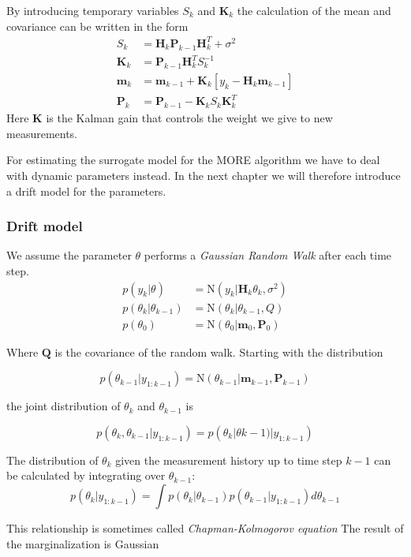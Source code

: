 By introducing temporary variables $S_k$ and $\mathbf{K}_k$ the calculation of
the mean and covariance can be written in the form
\begin{align*}
     S_k &= \textbf{H}_k \textbf{P}_{k-1} \textbf{H}^T_k + \sigma^2 \\
     \textbf{K}_k &= \textbf{P}_{k-1} \textbf{H}^T_k S_k^{-1} \\
     \textbf{m}_k &= \textbf{m}_{k-1} + \textbf{K}_k [y_k - \textbf{H}_k \textbf{m}_{k-1}] \\
     \textbf{P}_k &= \textbf{P}_{k-1} - \textbf{K}_k S_k \textbf{K}_k^T
\end{align*}
Here $\mathbf{K}$ is the Kalman gain that controls the weight we give to new
measurements.

For estimating the surrogate model for the MORE algorithm we have to
deal with dynamic parameters instead. In the next chapter we will therefore
introduce a drift model for the parameters.

\subsubsection{Drift model}
We assume the parameter $\theta$ performs a \textit{Gaussian Random Walk} after
each time step.
\begin{align}
  p(y_k | \theta) &= \text{N}(y_k | \mathbf{H}_k \theta_k, \sigma^2) \\
  p(\theta_k | \theta_{k-1}) &= \text{N} (\theta_k | \theta_{k-1}, Q) \\
  p(\theta_0) &= \text{N}(\theta_0 | \mathbf{m}_0, \mathbf{P}_0)
\end{align}

Where $\mathbf{Q}$ is the covariance of the random walk. 
Starting with the distribution

$$ p(\theta_{k-1} | y_{1:k-1})
= \text{N}(\theta_{k-1} | \mathbf{m}_{k-1}, \mathbf{P}_{k-1}) $$

the joint distribution of $\theta_k$ and $\theta_{k-1}$ is

$$ p(\theta_k, \theta_{k-1} | y_{1:k-1})
= p(\theta_k | \theta{k-1}) | y_{1:k-1})
$$

The distribution of $\theta_k$ given the measurement history up to time
step $k - 1$ can be calculated by integrating over
$\theta_{k-1}$:
$$ p(\theta_k | y_{1:k-1})
= \int p(\theta_k | \theta_{k-1}) p(\theta_{k-1} | y_{1:k-1}) d\theta_{k-1}
$$

This relationship is sometimes called \textit{Chapman-Kolmogorov equation}
The result of the marginalization is Gaussian

